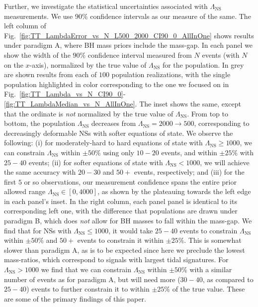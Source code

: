 \documentclass[aps,prd,amsmath,floats,floatfix, twocolumn,
superscriptaddress,nofootinbib,showpacs]{revtex4-1}
\newcommand{\lambdans}{\Lambda_\mathrm{NS}}
\begin{document}
Further, we investigate the statistical uncertainties associated with
$\lambdans$ measurements. We use $90\%$ confidence intervals as our measure of
the same. The left column of 
Fig.~\ref{fig:TT_LambdaError_vs_N_L500_2000_CI90_0_AllInOne} shows results
under paradigm A, where BH mass priors include the mass-gap. In each panel
we show the width of the $90\%$ confidence interval measured from $N$ events
(with $N$ on the $x$-axis), normalized by the true value of $\lambdans$ for
the population. In grey are shown results from each of $100$ population
realizations, with the single population highlighted in color corresponding
to the one we focused on in 
Fig.~\ref{fig:TT_Lambda_vs_N_CI90_0}-\ref{fig:TT_LambdaMedian_vs_N_AllInOne}.
The inset shows the same, except that the ordinate is {\it not} normalized by
the true value of $\lambdans$. From top to bottom, the population $\lambdans$
decreases from $\lambdans=2000\rightarrow 500$, corresponding to decreasingly
deformable NSs with softer equations of state. We observe the following:
(i) for moderately-hard to hard equations of state with $\lambdans\geq 1000$,
we can constrain $\lambdans$ within $\pm 50\%$ using only $10-20$ events, and
within $\pm 25\%$ with $25-40$ events; (ii) for softer equations of state with
$\lambdans<1000$, we will achieve the same accuracy with $20-30$ and $50+$ 
events, respectively; and (iii) for the first $5$ or so observations, our
measurement confidence spans the entire prior allowed range 
$\lambdans\in[0,4000]$, as shown by the plateauing towards the left edge in
each panel's inset.
% 
In the right column, each panel panel is identical to its corresponding left
one, with the difference that populations are drawn under paradigm B, which
does {\it not} allow for BH masses to fall within the mass-gap. We find that
for NSs with $\lambdans\leq 1000$, it would take $25-40$ events to
constrain $\lambdans$ within $\pm 50\%$ and $50+$ events to constrain it
within $\pm 25\%$. This is somewhat slower than paradigm A, as is to be
expected since here we preclude the lowest mass-ratios, which correspond to
signals with largest tidal signatures. For $\lambdans>1000$ we find that we
can constrain $\lambdans$ within $\pm 50\%$ with a similar number of events as
for paradigm A, but will need more ($30-40$, as compared to $25-40$) events
to further constrain it to within $\pm 25\%$ of the true value.
% 
These are some of the primary findings of this paper.
\end{document}
